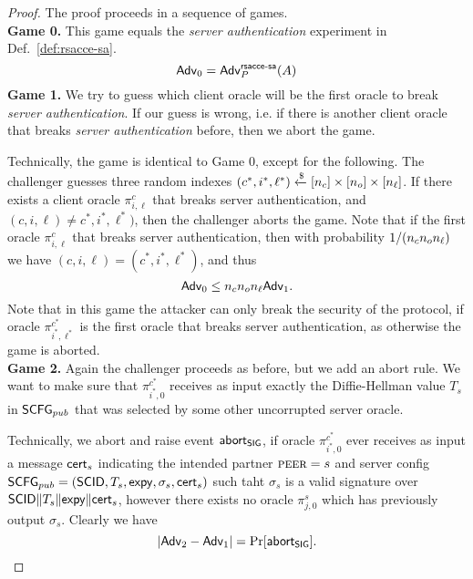 \begin{proof}
 The proof proceeds in a sequence of games. \vspace{10pt}\\
 {\bfseries Game 0.} This game equals the \textit{server authentication} experiment in Def.~\ref{def:rsacce-sa}.\\
 \begin{equation}
  \mathsf{Adv}_0 = \mathsf{Adv}^{\mathsf{rsacce\textsc{-} sa}}_{P}(A)
 \end{equation}%
%
%
 \textbf{Game 1.} We try to guess which client oracle will be the first oracle to break \textit{server authentication}. If our guess is wrong, i.e. if there is another client oracle that breaks \textit{server authentication} before, then we abort the game.

 Technically, the game is identical to Game 0, except for the following. The challenger guesses three random indexes $(c^{\ast}, i^{\ast}, \ell^{\ast}) \xleftarrow{\$} [n_c] \times [n_o] \times [n_{\ell}]$. If there exists a client oracle $\pi^c_{i,\ell}$ that breaks server authentication, and $(c, i, \ell) \neq c^{\ast}, i^{\ast}, \ell^{\ast})$, then the challenger aborts the game. Note that if the first oracle $\pi^c_{i,\ell}$ that breaks server authentication, then with probability $1/(n_c n_o n_{\ell})$ we have $(c,i,\ell) = (c^{\ast}, i^{\ast}, \ell^{\ast})$, and thus
 \begin{equation}
  \mathsf{Adv}_0 \leq n_c n_o n_{\ell} \mathsf{Adv}_1.
 \end{equation}%
 Note that in this game the attacker can only break the security of the protocol, if oracle $\pi^{c^{\ast}}_{i^{\ast},\ell^{\ast}}$ is the first oracle that breaks server authentication, as otherwise the game is aborted.
\vspace{10pt}\\%
%
%
 \textbf{Game 2.} Again the challenger proceeds as before, but we add an abort rule. We want to make sure that $\pi^{c^\ast}_{i^{\ast},0}$ receives as input exactly the Diffie-Hellman value $T_s$ in $\mathsf{SCFG}_{pub}$ that was selected by some other uncorrupted server oracle.

 Technically, we abort and raise event $\mathsf{abort}_{\mathsf{SIG}}$, if oracle $\pi^{c^{\ast}}_{i^{\ast},0}$ ever receives as input a message $\mathsf{cert}_s$ indicating the intended partner $\textsc{peer} = s$ and server config $\mathsf{SCFG}_{pub} = (\mathsf{SCID}, T_s, \mathsf{expy}, \sigma_s, \mathsf{cert}_s)$ such taht $\sigma_s$ is a valid signature over $\mathsf{SCID} \| T_s \| \mathsf{expy} \| \mathsf{cert}_s$, however there exists no oracle $\pi^s_{j,0}$ which has previously output $\sigma_s$. Clearly we have
 \begin{equation}
  |\mathsf{Adv}_2 - \mathsf{Adv}_1| = \Pr[\mathsf{abort}_{\mathsf{SIG}}].
 \end{equation}%


\end{proof}
